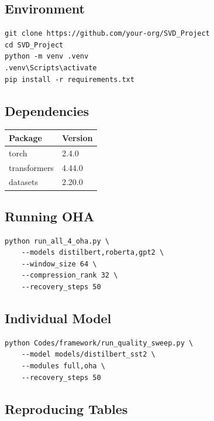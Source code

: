 \subsection{Environment}

\begin{lstlisting}
git clone https://github.com/your-org/SVD_Project
cd SVD_Project
python -m venv .venv
.venv\Scripts\activate
pip install -r requirements.txt
\end{lstlisting}

\subsection{Dependencies}

\begin{table}[H]
\centering
\small
\begin{tabular}{ll}
\toprule
\textbf{Package} & \textbf{Version} \\
\midrule
torch & 2.4.0 \\
transformers & 4.44.0 \\
datasets & 2.20.0 \\
\bottomrule
\end{tabular}
\end{table}

\subsection{Running OHA}

\begin{lstlisting}
python run_all_4_oha.py \
    --models distilbert,roberta,gpt2 \
    --window_size 64 \
    --compression_rank 32 \
    --recovery_steps 50
\end{lstlisting}

\subsection{Individual Model}

\begin{lstlisting}
python Codes/framework/run_quality_sweep.py \
    --model models/distilbert_sst2 \
    --modules full,oha \
    --recovery_steps 50
\end{lstlisting}

\subsection{Reproducing Tables}

